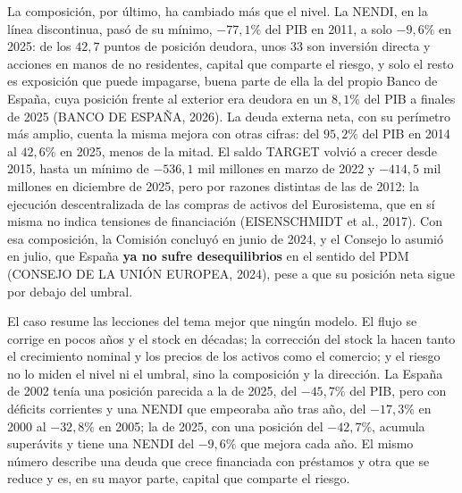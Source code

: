 \documentclass[10pt,a4paper]{article}
\begin{document}
La composición, por último, ha cambiado más que el nivel. La NENDI, en la línea discontinua, pasó de su mínimo, $-77{,}1\%$ del PIB en 2011, a solo $-9{,}6\%$ en 2025: de los $42{,}7$ puntos de posición deudora, unos $33$ son inversión directa y acciones en manos de no residentes, capital que comparte el riesgo, y solo el resto es exposición que puede impagarse, buena parte de ella la del propio Banco de España, cuya posición frente al exterior era deudora en un $8{,}1\%$ del PIB a finales de 2025 (BANCO DE ESPAÑA, 2026). La deuda externa neta, con su perímetro más amplio, cuenta la misma mejora con otras cifras: del $95{,}2\%$ del PIB en 2014 al $42{,}6\%$ en 2025, menos de la mitad. El saldo TARGET volvió a crecer desde 2015, hasta un mínimo de $-536{,}1$ mil millones en marzo de 2022 y $-414{,}5$ mil millones en diciembre de 2025, pero por razones distintas de las de 2012: la ejecución descentralizada de las compras de activos del Eurosistema, que en sí misma no indica tensiones de financiación (EISENSCHMIDT et al., 2017). Con esa composición, la Comisión concluyó en junio de 2024, y el Consejo lo asumió en julio, que España \textbf{ya no sufre desequilibrios} en el sentido del PDM (CONSEJO DE LA UNIÓN EUROPEA, 2024), pese a que su posición neta sigue por debajo del umbral.

El caso resume las lecciones del tema mejor que ningún modelo. El flujo se corrige en pocos años y el stock en décadas; la corrección del stock la hacen tanto el crecimiento nominal y los precios de los activos como el comercio; y el riesgo no lo miden el nivel ni el umbral, sino la composición y la dirección. La España de 2002 tenía una posición parecida a la de 2025, del $-45{,}7\%$ del PIB, pero con déficits corrientes y una NENDI que empeoraba año tras año, del $-17{,}3\%$ en 2000 al $-32{,}8\%$ en 2005; la de 2025, con una posición del $-42{,}7\%$, acumula superávits y tiene una NENDI del $-9{,}6\%$ que mejora cada año. El mismo número describe una deuda que crece financiada con préstamos y otra que se reduce y es, en su mayor parte, capital que comparte el riesgo.
\end{document}
